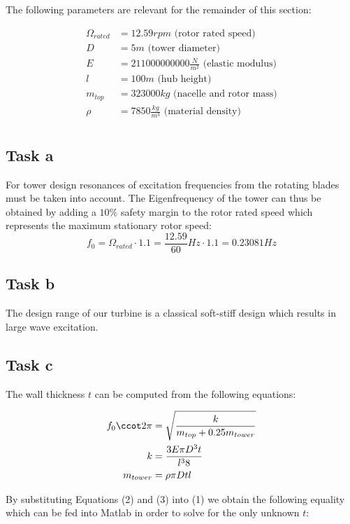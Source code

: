 \documentclass[10pt]{article}
\begin{document}
The following parameters are relevant for the remainder of this section:

\begin{align*}
	\Omega_{rated} &= 12.59 rpm \text{ (rotor rated speed)} \\
	D &= 5m \text{ (tower diameter)} \\
	E &=211000000000 \frac{N}{m^2} \text{ (elastic modulus)} \\
	l &=100m \text{ (hub height)} \\
	m_{top} &=323000 kg\text{ (nacelle and rotor mass)} \\
	\rho &=7850 \frac{kg}{m^3}\text{ (material density)} \\
\end{align*}

\subsection{Task a}
For tower design resonances of excitation frequencies from the rotating blades must be taken into account. The Eigenfrequency of the tower can thus be obtained by adding a $10 \%$ safety margin to the rotor rated speed which represents the maximum stationary rotor speed:
\begin{equation*}
	f_0 = \Omega_{rated} \cdot 1.1 = \frac{12.59}{60} Hz \cdot 1.1 = 0.23081 Hz
\end{equation*}

\subsection{Task b}
The design range of our turbine is a classical soft-stiff design which results in large wave excitation.

\subsection{Task c}
The wall thickness $t$ can be computed from the following equations:

\begin{align}
f_0 \ccot 2 \pi &= \sqrt{\frac{k}{m_{top} + 0.25 m_{tower}}} \\
k &= \frac{3 E \pi D^3 t}{l^3 8} \\
m_{tower} &= \rho \pi D t l
\end{align}

By substituting Equations (2) and (3) into (1) we obtain the following equality which can be fed into Matlab in order to solve for the only unknown $t$:\\
\end{document}
